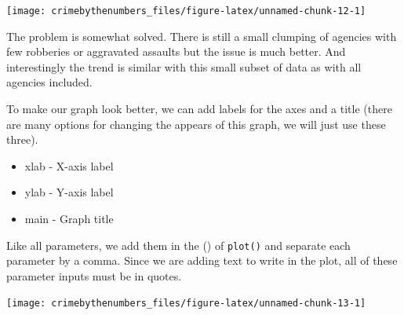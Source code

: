 \documentclass[
]{krantz}
\makeatletter
\newenvironment{Shaded}{\begin{snugshade}}{\end{snugshade}}
\newcommand{\AttributeTok}[1]{\textcolor[rgb]{0.61,0.61,0.61}{#1}}
\newcommand{\FunctionTok}[1]{\textcolor[rgb]{0,0,0}{#1}}
\newcommand{\NormalTok}[1]{#1}
\newcommand{\SpecialCharTok}[1]{\textcolor[rgb]{0,0,0}{#1}}
\newcommand{\StringTok}[1]{\textcolor[rgb]{0.5,0.5,0.5}{#1}}
\providecommand{\tightlist}{%
  \setlength{\itemsep}{0pt}\setlength{\parskip}{0pt}}
\newenvironment{kframe}{%
\medskip{}
\setlength{\fboxsep}{.8em}
 \def\at@end@of@kframe{}%
 \ifinner\ifhmode%
  \def\at@end@of@kframe{\end{minipage}}%
  \begin{minipage}{\columnwidth}%
 \fi\fi%
 \def\FrameCommand##1{\hskip\@totalleftmargin \hskip-\fboxsep
 \colorbox{shadecolor}{##1}\hskip-\fboxsep
     \hskip-\linewidth \hskip-\@totalleftmargin \hskip\columnwidth}%
 \MakeFramed {\advance\hsize-\width
   \@totalleftmargin\z@ \linewidth\hsize
   \@setminipage}}%
 {\par\unskip\endMakeFramed%
 \at@end@of@kframe}
\renewenvironment{Shaded}{\begin{kframe}}{\end{kframe}}
\makeatother
\begin{document}
\begin{Shaded}
\end{Shaded}

\begin{center}\texttt{[image: crimebythenumbers\_files/figure-latex/unnamed-chunk-12-1]} \end{center}

The problem is somewhat solved. There is still a small clumping of agencies with few robberies or aggravated assaults but the issue is much better. And interestingly the trend is similar with this small subset of data as with all agencies included.

To make our graph look better, we can add labels for the axes and a title (there are many options for changing the appears of this graph, we will just use these three).

\begin{itemize}
\tightlist
\item
  xlab - X-axis label
\item
  ylab - Y-axis label
\item
  main - Graph title
\end{itemize}

Like all parameters, we add them in the () of \texttt{plot()} and separate each parameter by a comma. Since we are adding text to write in the plot, all of these parameter inputs must be in quotes.

\begin{Shaded}
\end{Shaded}

\begin{center}\texttt{[image: crimebythenumbers\_files/figure-latex/unnamed-chunk-13-1]} \end{center}
\end{document}
